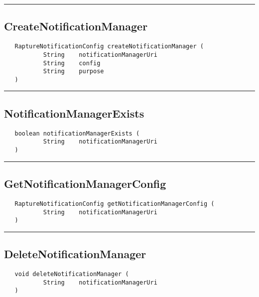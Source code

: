 \rule{15cm}{2pt}
\subsection{CreateNotificationManager}
\label{Api:CreateNotificationManager}
\begin{verbatim}
   RaptureNotificationConfig createNotificationManager (
           String    notificationManagerUri
           String    config
           String    purpose
   )
\end{verbatim}



\rule{15cm}{2pt}
\subsection{NotificationManagerExists}
\label{Api:NotificationManagerExists}
\begin{verbatim}
   boolean notificationManagerExists (
           String    notificationManagerUri
   )
\end{verbatim}



\rule{15cm}{2pt}
\subsection{GetNotificationManagerConfig}
\label{Api:GetNotificationManagerConfig}
\begin{verbatim}
   RaptureNotificationConfig getNotificationManagerConfig (
           String    notificationManagerUri
   )
\end{verbatim}



\rule{15cm}{2pt}
\subsection{DeleteNotificationManager}
\label{Api:DeleteNotificationManager}
\begin{verbatim}
   void deleteNotificationManager (
           String    notificationManagerUri
   )
\end{verbatim}




